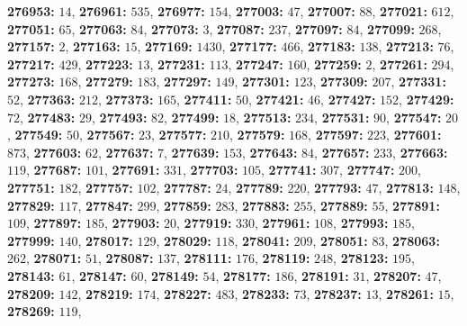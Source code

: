 \textsf{\bfseries 276953:} $14$, \textsf{\bfseries 276961:} $535$, \textsf{\bfseries 276977:} $154$, \textsf{\bfseries 277003:} $47$, \textsf{\bfseries 277007:} $88$, \textsf{\bfseries 277021:} $612$, \textsf{\bfseries 277051:} $65$, \textsf{\bfseries 277063:} $84$, \textsf{\bfseries 277073:} $3$, \textsf{\bfseries 277087:} $237$, \textsf{\bfseries 277097:} $84$, \textsf{\bfseries 277099:} $268$, \textsf{\bfseries 277157:} $2$, \textsf{\bfseries 277163:} $15$, \textsf{\bfseries 277169:} $1430$, \textsf{\bfseries 277177:} $466$, \textsf{\bfseries 277183:} $138$, \textsf{\bfseries 277213:} $76$, \textsf{\bfseries 277217:} $429$, \textsf{\bfseries 277223:} $13$, \textsf{\bfseries 277231:} $113$, \textsf{\bfseries 277247:} $160$, \textsf{\bfseries 277259:} $2$, \textsf{\bfseries 277261:} $294$, \textsf{\bfseries 277273:} $168$, \textsf{\bfseries 277279:} $183$, \textsf{\bfseries 277297:} $149$, \textsf{\bfseries 277301:} $123$, \textsf{\bfseries 277309:} $207$, \textsf{\bfseries 277331:} $52$, \textsf{\bfseries 277363:} $212$, \textsf{\bfseries 277373:} $165$, \textsf{\bfseries 277411:} $50$, \textsf{\bfseries 277421:} $46$, \textsf{\bfseries 277427:} $152$, \textsf{\bfseries 277429:} $72$, \textsf{\bfseries 277483:} $29$, \textsf{\bfseries 277493:} $82$, \textsf{\bfseries 277499:} $18$, \textsf{\bfseries 277513:} $234$, \textsf{\bfseries 277531:} $90$, \textsf{\bfseries 277547:} $20$, \textsf{\bfseries 277549:} $50$, \textsf{\bfseries 277567:} $23$, \textsf{\bfseries 277577:} $210$, \textsf{\bfseries 277579:} $168$, \textsf{\bfseries 277597:} $223$, \textsf{\bfseries 277601:} $873$, \textsf{\bfseries 277603:} $62$, \textsf{\bfseries 277637:} $7$, \textsf{\bfseries 277639:} $153$, \textsf{\bfseries 277643:} $84$, \textsf{\bfseries 277657:} $233$, \textsf{\bfseries 277663:} $119$, \textsf{\bfseries 277687:} $101$, \textsf{\bfseries 277691:} $331$, \textsf{\bfseries 277703:} $105$, \textsf{\bfseries 277741:} $307$, \textsf{\bfseries 277747:} $200$, \textsf{\bfseries 277751:} $182$, \textsf{\bfseries 277757:} $102$, \textsf{\bfseries 277787:} $24$, \textsf{\bfseries 277789:} $220$, \textsf{\bfseries 277793:} $47$, \textsf{\bfseries 277813:} $148$, \textsf{\bfseries 277829:} $117$, \textsf{\bfseries 277847:} $299$, \textsf{\bfseries 277859:} $283$, \textsf{\bfseries 277883:} $255$, \textsf{\bfseries 277889:} $55$, \textsf{\bfseries 277891:} $109$, \textsf{\bfseries 277897:} $185$, \textsf{\bfseries 277903:} $20$, \textsf{\bfseries 277919:} $330$, \textsf{\bfseries 277961:} $108$, \textsf{\bfseries 277993:} $185$, \textsf{\bfseries 277999:} $140$, \textsf{\bfseries 278017:} $129$, \textsf{\bfseries 278029:} $118$, \textsf{\bfseries 278041:} $209$, \textsf{\bfseries 278051:} $83$, \textsf{\bfseries 278063:} $262$, \textsf{\bfseries 278071:} $51$, \textsf{\bfseries 278087:} $137$, \textsf{\bfseries 278111:} $176$, \textsf{\bfseries 278119:} $248$, \textsf{\bfseries 278123:} $195$, \textsf{\bfseries 278143:} $61$, \textsf{\bfseries 278147:} $60$, \textsf{\bfseries 278149:} $54$, \textsf{\bfseries 278177:} $186$, \textsf{\bfseries 278191:} $31$, \textsf{\bfseries 278207:} $47$, \textsf{\bfseries 278209:} $142$, \textsf{\bfseries 278219:} $174$, \textsf{\bfseries 278227:} $483$, \textsf{\bfseries 278233:} $73$, \textsf{\bfseries 278237:} $13$, \textsf{\bfseries 278261:} $15$, \textsf{\bfseries 278269:} $119$, 
